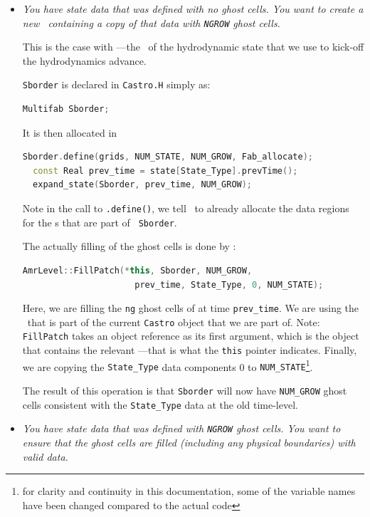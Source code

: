 \begin{itemize}

\item {\em You have state data that was defined with no ghost cells.  You
  want to create a new \multifab\ containing a copy of that data with
  {\tt NGROW} ghost cells.}

  This is the case with ---the \multifab\ of the
  hydrodynamic state that we use to kick-off the hydrodynamics 
  advance.

  {\tt Sborder} is declared in {\tt Castro.H} simply as:
\begin{lstlisting}[language=C++]
  Multifab Sborder;
\end{lstlisting}

  It is then allocated in 
\begin{lstlisting}[language=C++]
  Sborder.define(grids, NUM_STATE, NUM_GROW, Fab_allocate);                   
  const Real prev_time = state[State_Type].prevTime();                        
  expand_state(Sborder, prev_time, NUM_GROW);      
\end{lstlisting}
  Note in the call to {\tt .define()}, we tell \boxlib\ to already
  allocate the data regions for the \farraybox s that are part of {\tt
    Sborder}.

  The actually filling of the ghost cells is done by
  :
\begin{lstlisting}[language=C++]
  AmrLevel::FillPatch(*this, Sborder, NUM_GROW, 
                      prev_time, State_Type, 0, NUM_STATE);                
\end{lstlisting}
  Here, we are filling the {\tt ng} ghost cells of  at time {\tt prev\_time}.  We are using the
  \statedata\ that is part of the current {\tt Castro} object that we
  are part of.  Note: {\tt FillPatch} takes an object reference as its
  first argument, which is the object that contains the relevant
  \statedata---that is what the {\tt *this} pointer indicates.
  Finally, we are copying the {\tt State\_Type} data components 0 to
  {\tt NUM\_STATE}\footnote{for clarity and continuity in this
    documentation, some of the variable names have been changed
    compared to the actual code}.

The result of this operation is that {\tt Sborder} will now have
{\tt NUM\_GROW} ghost cells consistent with the {\tt State\_Type}
data at the old time-level.

\item {\em You have state data that was defined with {\tt NGROW} ghost
  cells.  You want to ensure that the ghost cells are filled
  (including any physical boundaries) with valid data.}


\end{itemize}
